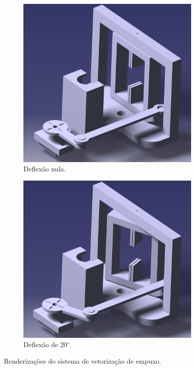 \begin{figure}[htbp]
    \centering
    \begin{subfigure}{0.49\textwidth}\centering
        \includegraphics[width=\textwidth]{img/tvc_assembly_render1.png}
        \caption{Deflexão nula.}\label{fig:jet_vanes_render1}
    \end{subfigure}
    \begin{subfigure}{0.49\textwidth}\centering
        \includegraphics[width=\textwidth]{img/tvc_assembly_render2.png}
        \caption{Deflexão de \(20\mathrm{^\circ}\).}\label{fig:jet_vanes_render2}
    \end{subfigure}
    \caption{Renderizações do sistema de vetorização de empuxo.}
\end{figure}

